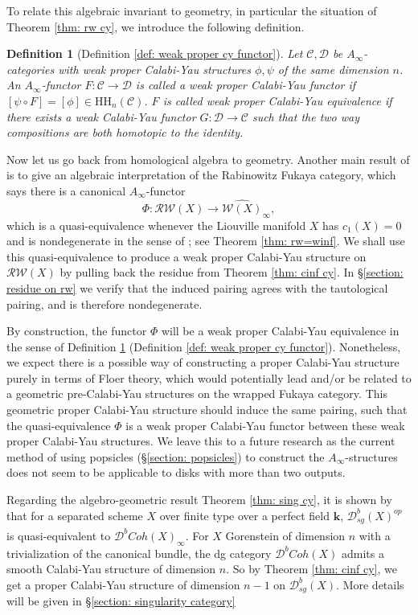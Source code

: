 \documentclass[11pt]{amsproc}
\def\K{{\mathbf{k}}}
\def\w{\mathcal{W}(E)}
\def\cc{\mathcal{C}}
\def\dd{\mathcal{D}}
\def\r#1{\mathrm{#1}}
\def\w{\mathcal{W}}
\def\rw{\mathcal{RW}}
\def\ainf{A_\infty}
\newtheorem{defn}[lem]{Definition}
\theoremstyle{remark}
\numberwithin{equation}{section}
\begin{document}
To relate this algebraic invariant to geometry, in particular the situation of Theorem \ref{thm: rw cy},
we introduce the following definition.

\begin{defn}[Definition \ref{def: weak proper cy functor}]\label{def: cy fun}
Let $\cc, \dd$ be $\ainf$-categories with weak proper Calabi-Yau structures $\phi, \psi$ of the same dimension $n$.
An $\ainf$-functor $F: \cc \to \dd$ is called a weak proper Calabi-Yau functor if $[\psi \circ F] = [\phi] \in \r{HH}_{n}(\cc)$.
$F$ is called weak proper Calabi-Yau equivalence if there exists a weak Calabi-Yau functor $G: \dd \to \cc$ such that the two way compositions are both homotopic to the identity.
\end{defn}

Now let us go back from homological algebra to geometry.
Another main result of \cite[Theorem 1.1]{GGV} is to give an algebraic interpretation of the Rabinowitz Fukaya category, 
which says there is a canonical $\ainf$-functor
\begin{equation}\label{rw to winf}
\Phi: \rw(X) \to \widehat{\w(X)}_{\infty},
\end{equation}
which is a quasi-equivalence whenever the Liouville manifold $X$ has $c_{1}(X)=0$ and is nondegenerate in the sense of \cite{ganatra}; see Theorem \ref{thm: rw=winf}.
We shall use this quasi-equivalence to produce a weak proper Calabi-Yau structure on $\rw(X)$ by pulling back the residue from Theorem \ref{thm: cinf cy}.
In \S\ref{section: residue on rw} we verify that the induced pairing agrees with the tautological pairing, 
and is therefore nondegenerate.

By construction, the functor $\Phi$ will be a weak proper Calabi-Yau equivalence in the sense of Definition \ref{def: cy fun} (Definition \ref{def: weak proper cy functor}). 
Nonetheless, we expect there is a possible way of constructing a proper Calabi-Yau structure purely in terms of Floer theory,
which would potentially lead and/or be related to a geometric pre-Calabi-Yau structures on the wrapped Fukaya category.
This geometric proper Calabi-Yau structure should induce the same pairing, 
such that the quasi-equivalence $\Phi$ is a weak proper Calabi-Yau functor between these weak proper Calabi-Yau structures.
We leave this to a future research as the current method of using popsicles (\S\ref{section: popsicles}) to construct the $\ainf$-structures does not seem to be applicable to disks with more than two outputs.

Regarding the algebro-geometric result Theorem \ref{thm: sing cy},
it is shown by \cite[Theorem 9.2]{efimov2} that for a separated scheme $X$ over finite type over a perfect field $\K$,
$\dd^{b}_{sg}(X)^{op}$ is quasi-equivalent to $\widehat{\dd^{b}Coh(X)}_{\infty}$.
For $X$ Gorenstein of dimension $n$ with a trivialization of the canonical bundle,
the dg category $\dd^{b}Coh(X)$ admits a smooth Calabi-Yau structure of dimension $n$.
So by Theorem \ref{thm: cinf cy}, we get a proper Calabi-Yau structure of dimension $n-1$ on $\dd^{b}_{sg}(X)$.
More details will be given in \S\ref{section: singularity category}
\end{document}
